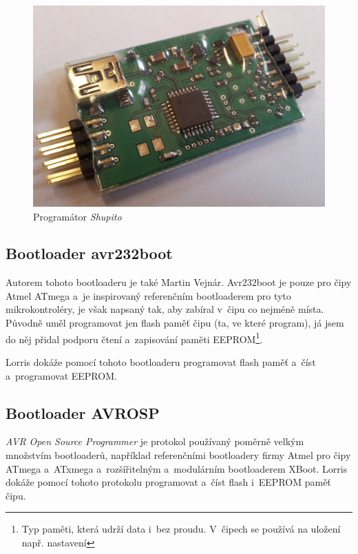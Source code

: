 \documentclass[12pt, a4paper, oneside]{article}
\newcommand{\It}{\textit}  %
\begin{document}
\begin{figure}[H]
\begin{center}
\includegraphics[width=\textwidth]{img/shupito_promo.jpg}
\caption{Programátor \It{Shupito}}
\label{prog_mini}
\end{center}
\end{figure}

\subsection{Bootloader avr232boot}
Autorem tohoto bootloaderu je také Martin Vejnár. Avr232boot je pouze pro čipy Atmel ATmega a~je inspirovaný referenčním bootloaderem pro tyto mikrokontroléry, je však napsaný tak, aby zabíral v~čipu co nejméně místa. Původně uměl programovat jen flash paměť čipu (ta, ve které program), já jsem do něj přidal podporu čtení a~zapisování paměti EEPROM\footnote{Typ paměti, která udrží data i~bez proudu. V~čipech se používá na uložení např. nastavení}.

Lorris dokáže pomocí tohoto bootloaderu programovat flash paměť a~číst a~programovat EEPROM.

\subsection{Bootloader AVROSP}
\It{AVR Open Source Programmer} je protokol používaný poměrně velkým množstvím bootloaderů, například referenčními bootloadery firmy Atmel pro čipy ATmega a~ATxmega a~rozšířitelným a~modulárním bootloaderem XBoot\cite{xboot}. Lorris dokáže pomocí tohoto protokolu programovat a~číst flash i~EEPROM paměť čipu.


\newpage
\end{document}
